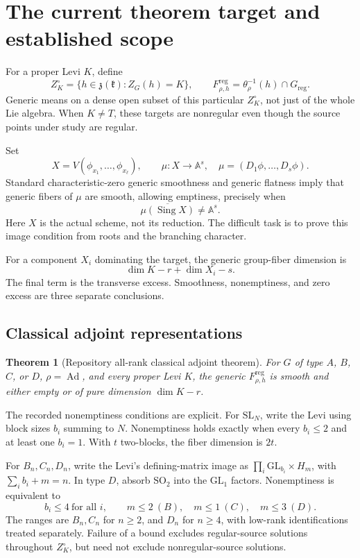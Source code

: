 \documentclass[11pt]{article}
\newcommand{\kk}{\mathfrak k}
\newcommand{\Ad}{\operatorname{Ad}}
\newcommand{\reg}{\mathrm{reg}}
\newcommand{\Sing}{\operatorname{Sing}}
\newtheorem{theorem}{Theorem}[section]
\begin{document}
\section{The current theorem target and established scope}

For a proper Levi $K$, define
\[
 Z_K^\circ=\{h\in\mathfrak z(\kk):Z_G(h)=K\},\qquad
 F_{\rho,h}^{\reg}=\theta_\rho^{-1}(h)\cap G_{\reg}.
\]
Generic means on a dense open subset of this particular $Z_K^\circ$, not just of the whole Lie algebra. When $K\ne T$, these targets are nonregular even though the source points under study are regular.

Set
\[
 X=V(\phi_{x_1},\ldots,\phi_{x_\ell}),\qquad
 \mu:X\to\mathbb A^s,\quad\mu=(D_1\phi,\ldots,D_s\phi).
\]
Standard characteristic-zero generic smoothness and generic flatness imply that generic fibers of $\mu$ are smooth, allowing emptiness, precisely when
\begin{equation}\label{eq:badimage}
 \overline{\mu(\Sing X)}\ne\mathbb A^s.
\end{equation}
Here $X$ is the actual scheme, not its reduction. The difficult task is to prove this image condition from roots and the branching character.

For a component $X_i$ dominating the target, the generic group-fiber dimension is
\begin{equation}\label{eq:excess}
 \dim K-r+\dim X_i-s.
\end{equation}
The final term is the transverse excess. Smoothness, nonemptiness, and zero excess are three separate conclusions.

\subsection{Classical adjoint representations}

\begin{theorem}[Repository all-rank classical adjoint theorem]
For $G$ of type $A$, $B$, $C$, or $D$, $\rho=\Ad$, and every proper Levi $K$, the generic $F_{\rho,h}^{\reg}$ is smooth and either empty or of pure dimension $\dim K-r$.
\end{theorem}

The recorded nonemptiness conditions are explicit. For $\mathrm{SL}_N$, write the Levi using block sizes $b_i$ summing to $N$. Nonemptiness holds exactly when every $b_i\le2$ and at least one $b_i=1$. With $t$ two-blocks, the fiber dimension is $2t$.

For $B_n,C_n,D_n$, write the Levi's defining-matrix image as
$\prod_i\mathrm{GL}_{b_i}\times H_m$, with $\sum_i b_i+m=n$. In type $D$, absorb $\mathrm{SO}_2$ into the $\mathrm{GL}_1$ factors. Nonemptiness is equivalent to
\[
 b_i\le4\ \text{for all }i,\qquad
 m\le2\ (B),\quad m\le1\ (C),\quad m\le3\ (D).
\]
The ranges are $B_n,C_n$ for $n\ge2$, and $D_n$ for $n\ge4$, with low-rank identifications treated separately. Failure of a bound excludes regular-source solutions throughout $Z_K^\circ$, but need not exclude nonregular-source solutions.
\end{document}
